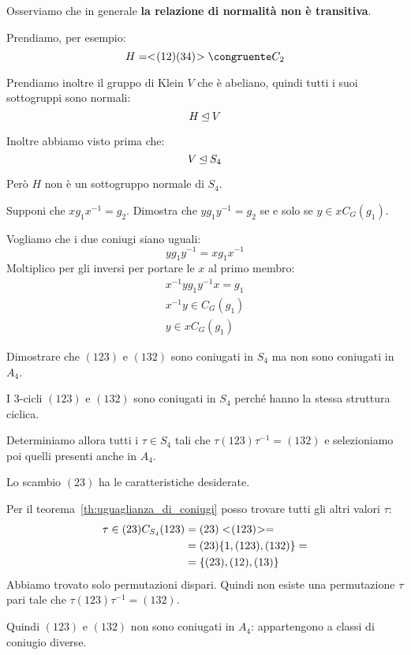 Osserviamo che in generale \textbf{la relazione di normalità non è transitiva}.

Prendiamo, per esempio:
\begin{equation}
	H = \gen{(12)(34)} \congruente C_2
\end{equation}

Prendiamo inoltre il gruppo di Klein $V$ che è abeliano, quindi tutti i suoi sottogruppi sono normali:
\begin{equation}
	H \unlhd V
\end{equation}

Inoltre abbiamo visto prima che:
\begin{equation}
	V \unlhd S_4
\end{equation}

Però $H$ non è un sottogruppo normale di $S_4$.

\begin{teorema}
	\label{th:uguaglianza_di_coniugi}
	Supponi che $xg_1 x^{-1} = g_2$.
	Dimostra che $y g_1 y^{-1} = g_2$ se e solo se $y \in x C_G(g_1)$.
\end{teorema}
\begin{dimostrazione}
	Vogliamo che i due coniugi siano uguali:
	\begin{equation}
		y g_1 y^{-1} = x g_1 x^{-1}
	\end{equation}
	Moltiplico per gli inversi per portare le $x$ al primo membro:
	\begin{gather}
		x^{-1} y g_1 y^{-1} x = g_1 \\
		x^{-1} y \in C_G(g_1) \\
		y \in x C_G(g_1)
	\end{gather}
\end{dimostrazione}

\begin{esercizio}
	\label{th:non_coniugati_in_a4}
	Dimostrare che $(123)$ e $(132)$ sono coniugati in $S_4$ ma non sono coniugati in $A_4$.
\end{esercizio}
\begin{soluzione}
	I 3-cicli $(123)$ e $(132)$ sono coniugati in $S_4$ perché hanno la stessa struttura ciclica.

	Determiniamo allora tutti i $\tau \in S_4$ tali che $\tau (123) \tau^{-1} = (132)$ e selezioniamo poi quelli
	presenti anche in $A_4$.

	Lo scambio $(23)$ ha le caratteristiche desiderate.

	Per il teorema~\ref{th:uguaglianza_di_coniugi} posso trovare tutti gli altri valori $\tau$:
	\begin{align}
		\tau \in (23) C_{S_4}(123) &= (23) < \negmedspace (123) \negmedspace > = \\
		&= (23)\{1, (123), (132)\} = \\
		&= \{(23), (12), (13)\}
	\end{align}
	Abbiamo trovato solo permutazioni dispari.
	Quindi non esiste una permutazione $\tau$ pari tale che $\tau (123) \tau^{-1} = (132)$.

	Quindi $(123)$ e $(132)$ non sono coniugati in $A_4$: appartengono a classi di coniugio diverse.
\end{soluzione}

